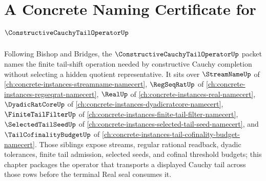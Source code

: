\chapter{A Concrete Naming Certificate for $\ConstructiveCauchyTailOperatorUp$}
\label{ch:concrete-instances-constructive-cauchy-tail-operator-namecert}

Following Bishop and Bridges, the $\ConstructiveCauchyTailOperatorUp$ packet names the finite tail-shift operation needed by constructive Cauchy completion without selecting a hidden quotient representative. It sits over $\StreamNameUp$ of \autoref{ch:concrete-instances-streamname-namecert}, $\RegSeqRatUp$ of \autoref{ch:concrete-instances-regseqrat-namecert}, $\RealUp$ of \autoref{ch:concrete-instances-real-namecert}, $\DyadicRatCoreUp$ of \autoref{ch:concrete-instances-dyadicratcore-namecert}, $\FiniteTailFilterUp$ of \autoref{ch:concrete-instances-finite-tail-filter-namecert}, $\SelectedTailSeedUp$ of \autoref{ch:concrete-instances-selected-tail-seed-namecert}, and $\TailCofinalityBudgetUp$ of \autoref{ch:concrete-instances-tail-cofinality-budget-namecert}. Those siblings expose streams, regular rational readback, dyadic tolerances, finite tail admission, selected seeds, and cofinal threshold budgets; this chapter packages the operator that transports a displayed Cauchy tail across those rows before the terminal Real seal consumes it.

